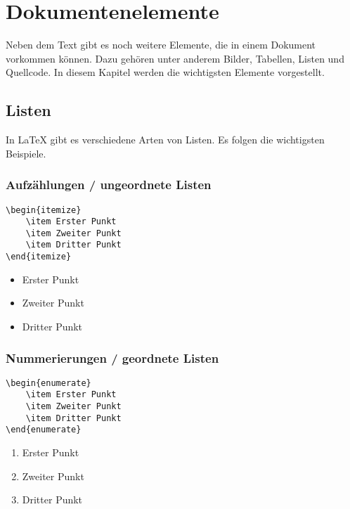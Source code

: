 \section{Dokumentenelemente}
Neben dem Text gibt es noch weitere Elemente, die in einem Dokument vorkommen können. Dazu gehören unter anderem Bilder, Tabellen, Listen und Quellcode. In diesem Kapitel werden die wichtigsten Elemente vorgestellt.

\subsection{Listen}
In \LaTeX{} gibt es verschiedene Arten von Listen. Es folgen die wichtigsten Beispiele.

\subsubsection{Aufzählungen / ungeordnete Listen}

\begin{minipage}{0.58\textwidth}
    \begin{lstlisting}
\begin{itemize}
    \item Erster Punkt
    \item Zweiter Punkt
    \item Dritter Punkt
\end{itemize}
\end{lstlisting}
\end{minipage}
\hfill
\begin{minipage}{0.35\textwidth}
    \begin{itemize}
        \item Erster Punkt
        \item Zweiter Punkt
        \item Dritter Punkt
    \end{itemize}
\end{minipage}

\subsubsection{Nummerierungen / geordnete Listen}

\begin{minipage}{0.58\textwidth}
    \begin{lstlisting}
\begin{enumerate}
    \item Erster Punkt
    \item Zweiter Punkt
    \item Dritter Punkt
\end{enumerate}
\end{lstlisting}
\end{minipage}
\hfill
\begin{minipage}{0.35\textwidth}
    \begin{enumerate}
        \item Erster Punkt
        \item Zweiter Punkt
        \item Dritter Punkt
    \end{enumerate}
\end{minipage}

